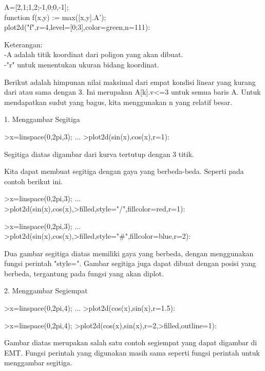 \documentclass[a4paper,10pt]{article}
\begin{document}
\begin{eulernotebook}
\begin{eulercomment}
\begin{eulercomment}
\begin{eulercomment}
\begin{eulercomment}
\begin{eulercomment}
\begin{eulercomment}
\begin{eulercomment}
\begin{eulercomment}
\begin{eulercomment}
A=[2,1;1,2;-1,0;0,-1];\\
function f(x,y) := max([x,y].A');\\
plot2d("f",r=4,level=[0;3],color=green,n=111):

Keterangan:\\
-A adalah titik koordinat dari poligon yang akan dibuat.\\
-"r" untuk menentukan ukuran bidang koordinat.

Berikut adalah himpunan nilai maksimal dari empat kondisi linear yang
kurang dari atau sama dengan 3. Ini merupakan A[k].v\textless{}=3 untuk semua
baris A. Untuk mendapatkan sudut yang bagus, kita menggunakan n yang
relatif besar.


1. Menggambar Segitiga
\end{eulercomment}
\begin{eulerprompt}
>x=linspace(0,2pi,3); ...
>plot2d(sin(x),cos(x),r=1):
\end{eulerprompt}
\begin{eulercomment}
Segitiga diatas digambar dari kurva tertutup dengan 3 titik.

Kita dapat membuat segitiga dengan gaya yang berbeda-beda. Seperti
pada contoh berikut ini.
\end{eulercomment}
\begin{eulerprompt}
>x=linspace(0,2pi,3); ...
>plot2d(sin(x),cos(x),>filled,style="/",fillcolor=red,r=1):
\end{eulerprompt}
\begin{eulerprompt}
>x=linspace(0,2pi,3); ...
>plot2d(sin(x),cos(x),>filled,style="#",fillcolor=blue,r=2):
\end{eulerprompt}
\begin{eulercomment}
Dua gambar segitiga diatas memiliki gaya yang berbeda, dengan
menggunakan fungsi perintah "style=". Gambar segitiga juga dapat
dibuat dengan posisi yang berbeda, tergantung pada fungsi yang akan
diplot.


2. Menggambar Segiempat
\end{eulercomment}
\begin{eulerprompt}
>x=linspace(0,2pi,4); ...
>plot2d(cos(x),sin(x),r=1.5):
\end{eulerprompt}
\begin{eulerprompt}
>x=linspace(0,2pi,4); 
>plot2d(cos(x),sin(x),r=2,>filled,outline=1):
\end{eulerprompt}
\begin{eulercomment}
Gambar diatas merupakan salah satu contoh segiempat yang dapat
digambar di EMT. Fungsi perintah yang digunakan masih sama seperti
fungsi perintah untuk menggambar segitiga. 


\end{eulercomment}
\end{eulercomment}
\end{eulercomment}
\end{eulercomment}
\end{eulercomment}
\end{eulercomment}
\end{eulercomment}
\end{eulercomment}
\end{eulercomment}
\end{eulernotebook}
\end{document}
